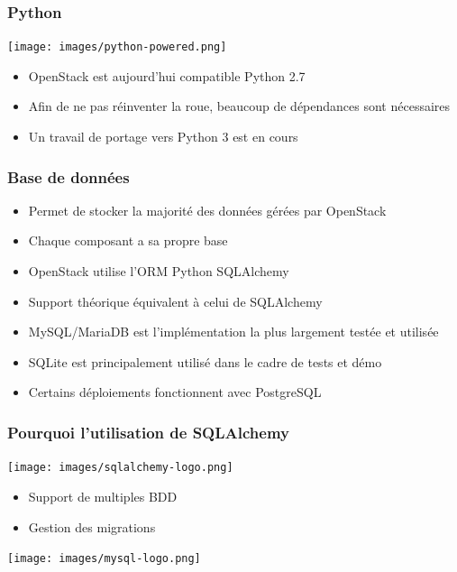  \begin{frame}
    \frametitle{Python}
    \begin{center}
      \texttt{[image: images/python-powered.png]}
    \end{center}
    \begin{itemize}
      \item OpenStack est aujourd'hui compatible Python 2.7
      \item Afin de ne pas réinventer la roue, beaucoup de dépendances sont nécessaires
      \item Un travail de portage vers Python 3 est en cours
    \end{itemize}
  \end{frame}

  \begin{frame}
    \frametitle{Base de données}
    \begin{itemize}
      \item Permet de stocker la majorité des données gérées par OpenStack
      \item Chaque composant a sa propre base
      \item OpenStack utilise l'ORM Python SQLAlchemy
      \item Support théorique équivalent à celui de SQLAlchemy
      \item MySQL/MariaDB est l'implémentation la plus largement testée et utilisée
      \item SQLite est principalement utilisé dans le cadre de tests et démo
      \item Certains déploiements fonctionnent avec PostgreSQL
    \end{itemize}
  \end{frame}

  \begin{frame}
    \frametitle{Pourquoi l'utilisation de SQLAlchemy}
    \begin{center}
      \texttt{[image: images/sqlalchemy-logo.png]}
    \end{center}
    \begin{itemize}
      \item Support de multiples BDD
      \item Gestion des migrations
    \end{itemize}
    \begin{center}
      \texttt{[image: images/mysql-logo.png]}
    \end{center}
  \end{frame}

